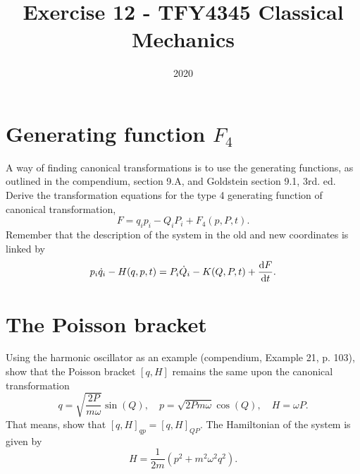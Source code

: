 \documentclass{article}
\title{Exercise 12 - TFY4345 Classical Mechanics}
\date{2020}
\begin{document}
    \maketitle
    \section{Generating function $F_4$}
        A way of finding canonical transformations is to use the generating functions, as outlined in the compendium, section 9.A, and Goldstein section 9.1, 3rd. ed. Derive the transformation equations for the type 4 generating function of canonical transformation, 
        \begin{equation*}
            F = q_ip_i - Q_iP_i + F_4(p, P, t).
        \end{equation*}
        Remember that the description of the system in the old and new coordinates is linked by
        \begin{equation*}
            p_i \dot q_i - H(q, p, t) = P_i \dot Q_i - K(Q, P, t) + \dv{F}{t}.
        \end{equation*}

    \section{The Poisson bracket}
        Using the harmonic oscillator as an example (compendium, Example 21, p. 103), show that the Poisson bracket $[q, H]$ remains the same upon the canonical transformation 
        \begin{equation*}
            q = \sqrt{\frac{2P}{m \omega}} \sin(Q), \quad p = \sqrt{2 P m \omega} \cos(Q), \quad H = \omega P.
        \end{equation*}
        That means, show that $[q, H]_{qp} = [q, H]_{QP}$. The Hamiltonian of the system is given by 
        \begin{equation*}
            H = \frac{1}{2m} \left(p^2 + m^2 \omega^2 q^2\right).
        \end{equation*}
\end{document}
